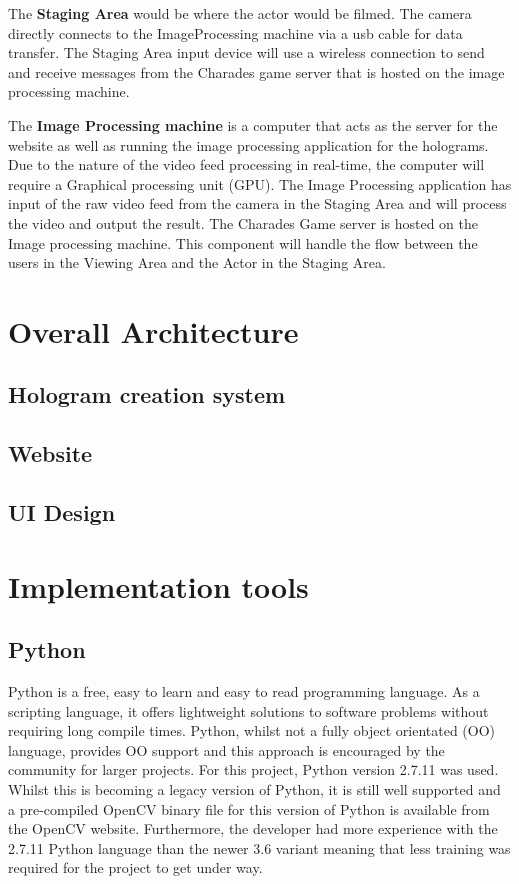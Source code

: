 The \textbf{Staging Area} would be where the actor would be filmed. The camera directly connects to the ImageProcessing machine via a usb cable for data transfer. The Staging Area input device will use a wireless connection to send and receive messages from the Charades game server that is hosted on the image processing machine.

The \textbf{Image Processing machine} is a computer that acts as the server for the website as well as running the image processing application for the holograms. Due to the nature of the video feed processing in real-time, the computer will require a Graphical processing unit (GPU). The Image Processing application has input of the raw video feed from the camera in the Staging Area and will process the video and output the result.
The Charades Game server is hosted on the Image processing machine. This component will handle the flow between the users in the Viewing Area and the Actor in the Staging Area.
\section{Overall Architecture}
\subsection{Hologram creation system}

\subsection{Website}

\subsection{UI Design}

\section{Implementation tools}
\subsection{Python}
Python is a free, easy to learn and easy to read programming language. As a scripting language, it offers lightweight solutions to software problems without requiring long compile times. Python, whilst not a fully object orientated (OO) language, provides OO support and this approach is encouraged by the community for larger projects. For this project, Python version 2.7.11 was used. Whilst this is becoming a legacy version of Python, it is still well supported and a pre-compiled OpenCV binary file for this version of Python is available from the OpenCV website. Furthermore, the developer had more experience with the 2.7.11 Python language than the newer 3.6 variant meaning that less training was required for the project to get under way.


